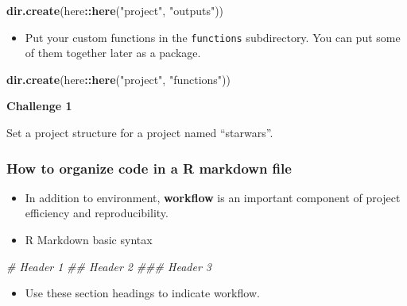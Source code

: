 \documentclass[
]{book}
\newenvironment{Shaded}{\begin{snugshade}}{\end{snugshade}}
\newcommand{\CommentTok}[1]{\textcolor[rgb]{0.56,0.35,0.01}{\textit{#1}}}
\newcommand{\KeywordTok}[1]{\textcolor[rgb]{0.13,0.29,0.53}{\textbf{#1}}}
\newcommand{\NormalTok}[1]{#1}
\newcommand{\OperatorTok}[1]{\textcolor[rgb]{0.81,0.36,0.00}{\textbf{#1}}}
\newcommand{\StringTok}[1]{\textcolor[rgb]{0.31,0.60,0.02}{#1}}
\providecommand{\tightlist}{%
  \setlength{\itemsep}{0pt}\setlength{\parskip}{0pt}}
\begin{document}
\begin{Shaded}
\begin{Highlighting}[]
\KeywordTok{dir.create}\NormalTok{(here}\OperatorTok{::}\KeywordTok{here}\NormalTok{(}\StringTok{"project"}\NormalTok{, }\StringTok{"outputs"}\NormalTok{))}
\end{Highlighting}
\end{Shaded}

\begin{itemize}
\tightlist
\item
  Put your custom functions in the \texttt{functions} subdirectory. You can put some of them together later as a package.
\end{itemize}

\begin{Shaded}
\begin{Highlighting}[]
\KeywordTok{dir.create}\NormalTok{(here}\OperatorTok{::}\KeywordTok{here}\NormalTok{(}\StringTok{"project"}\NormalTok{, }\StringTok{"functions"}\NormalTok{))}
\end{Highlighting}
\end{Shaded}

\textbf{Challenge 1}

Set a project structure for a project named ``starwars''.

\hypertarget{how-to-organize-code-in-a-r-markdown-file}{%
\subsubsection{How to organize code in a R markdown file}\label{how-to-organize-code-in-a-r-markdown-file}}

\begin{itemize}
\item
  In addition to environment, \textbf{workflow} is an important component of project efficiency and reproducibility.
\item
  R Markdown basic syntax
\end{itemize}

\begin{Shaded}
\begin{Highlighting}[]
\CommentTok{\# Header 1}
\CommentTok{\#\# Header 2}
\CommentTok{\#\#\# Header 3}
\end{Highlighting}
\end{Shaded}

\begin{itemize}
\tightlist
\item
  Use these section headings to indicate workflow.
\end{itemize}
\end{document}
